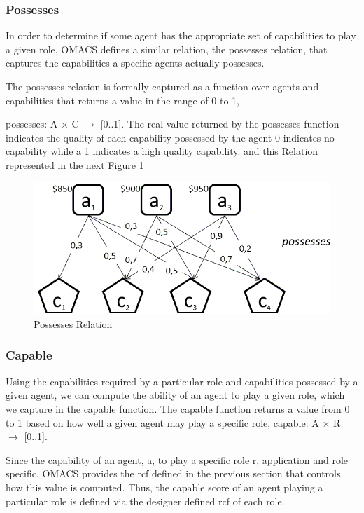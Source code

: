 \subsubsection{Possesses}
In order to determine if some agent has the appropriate set of capabilities to play a given role, OMACS defines a similar relation, the possesses relation, that captures the capabilities a specific agents actually possesses\cite{omacs4}.

The possesses relation is formally captured as a function over agents and capabilities that returns a value in the range of 0 to 1,

possesses: A $\times$ C $\rightarrow$ [0..1]. The real value returned by the possesses function indicates the quality of each capability possessed by the agent 0 indicates no capability while a 1 indicates a high quality capability\cite{omacs4}.
and this Relation represented in the next Figure \ref{fig:Possesses Relation}


\begin{figure}[th]
	\centering
		\includegraphics[scale=0.5]{ch1/img/RelPossess}
	\caption{\label{fig:Possesses Relation}Possesses Relation}
\end{figure}


\subsubsection{Capable}
Using the capabilities required by a particular role and capabilities possessed by a given agent, we can compute the ability of an agent to play a given role, which we capture in the capable function. The capable function returns a value from 0 to 1 based on how well a given agent may play a specific role, capable: A $\times$ R $\rightarrow$ {[}0..1{]}\cite{omacs2}.

Since the capability of an agent, a, to play a specific role r, application and role specific, OMACS provides the rcf defined in the previous section that controls how this value is computed. Thus, the capable score of an agent playing a particular role is defined via the designer defined rcf of each role.

